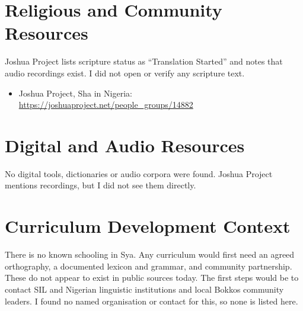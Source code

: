 \documentclass[12pt]{article}
\begin{document}
\section{Religious and Community Resources}
Joshua Project lists scripture status as ``Translation Started'' and notes that audio recordings exist. I did not open or verify any scripture text.
\begin{itemize}
\item Joshua Project, Sha in Nigeria: \url{https://joshuaproject.net/people_groups/14882}
\end{itemize}

\section{Digital and Audio Resources}
No digital tools, dictionaries or audio corpora were found. Joshua Project mentions recordings, but I did not see them directly.

\section{Curriculum Development Context}
There is no known schooling in Sya. Any curriculum would first need an agreed orthography, a documented lexicon and grammar, and community partnership. These do not appear to exist in public sources today. The first steps would be to contact SIL and Nigerian linguistic institutions and local Bokkos community leaders. I found no named organisation or contact for this, so none is listed here.
\end{document}
